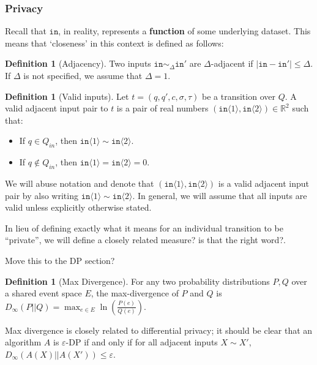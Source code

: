 \documentclass[12pt]{article}
\newcommand{\RR}{\mathbb{R}}
\newcommand{\brangle}[1]{\langle #1 \rangle}
\theoremstyle{definition}
\newtheorem{defn}[thm]{Definition}
\begin{document}
\subsubsection{Privacy}

Recall that $\texttt{in}$, in reality, represents a \textbf{function} of some underlying dataset. This means that `closeness' in this context is defined as follows:

\begin{defn}[Adjacency]
    Two inputs $\texttt{in}\sim_{\Delta} \texttt{in}'$ are $\Delta$-adjacent if $|\texttt{in}-\texttt{in}'|\leq \Delta$. If $\Delta$ is not specified, we assume that $\Delta = 1$. 
\end{defn}

\begin{defn}[Valid inputs]
    Let $t = (q, q', c, \sigma, \tau)$ be a transition over $Q$. A valid adjacent input pair to $t$ is a pair of real numbers $(\texttt{in}\brangle{1}, \texttt{in}\brangle{2})\in \RR^2$ such that:
    \begin{itemize}
        \item If $q\in Q_{in}$, then $\texttt{in}\brangle{1}\sim \texttt{in}\brangle{2}$. 
        \item If $q\notin Q_{in}$, then $\texttt{in}\brangle{1} = \texttt{in}\brangle{2} = 0$.
    \end{itemize}
    We will abuse notation and denote that $(\texttt{in}\brangle{1}, \texttt{in}\brangle{2})$ is a valid adjacent input pair by also writing $\texttt{in}\brangle{1}\sim\texttt{in}\brangle{2}$. In general, we will assume that all inputs are valid unless explicitly otherwise stated.
\end{defn}

In lieu of defining exactly what it means for an individual transition to be ``private'', we will define a closely related {\color{red}measure? is that the right word?}.

{\color{red} Move this to the DP section?}

\begin{defn}[Max Divergence]
    For any two probability distributions $P, Q$ over a shared event space $E$, the max-divergence of $P$ and $Q$ is 
    $D_{\infty}(P||Q) = \max_{e\in E}\ln\left(\frac{P(e)}{Q(e)}\right)$.
\end{defn}

Max divergence is closely related to differential privacy; it should be clear that an algorithm $A$ is $\varepsilon$-DP if and only if for all adjacent inputs $X\sim X'$, $D_{\infty}(A(X)||A(X'))\leq \varepsilon$. 
\end{document}
